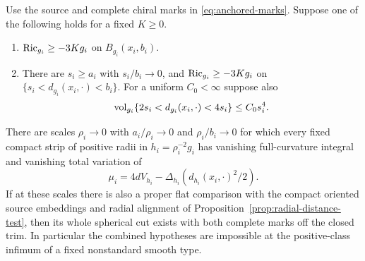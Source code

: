 \begin{proposition}
\label{prop:physical-ricci-flux}
Use the source and complete chiral marks in
\eqref{eq:anchored-marks}. Suppose one of the following
holds for a fixed \(K\ge0\).
\begin{enumerate}
\item \(\operatorname{Ric}_{g_i}\ge-3K g_i\) on \(B_{g_i}(x_i,b_i)\).
\item There are \(s_i\ge a_i\) with \(s_i/b_i\to0\), and
\(\operatorname{Ric}_{g_i}\ge-3K g_i\) on
\(\{s_i<d_{g_i}(x_i,\cdot)<b_i\}\).
For a uniform \(C_0<\infty\) suppose also
\[
 \operatorname{vol}_{g_i}\{2s_i<d_{g_i}(x_i,\cdot)<4s_i\}\le C_0s_i^4 .
\]
\end{enumerate}
There are scales \(\rho_i\to0\) with
\(a_i/\rho_i\to0\) and \(\rho_i/b_i\to0\) for which every
fixed compact strip of positive radii in
\(h_i=\rho_i^{-2}g_i\) has vanishing full-curvature integral
and vanishing total variation of
\[
 \mu_i=4dV_{h_i}-\Delta_{h_i}(d_{h_i}(x_i,\cdot)^2/2).
\]
If at these scales there is also a proper flat comparison
with the compact oriented source embeddings and radial
alignment of Proposition~\ref{prop:radial-distance-test},
then its whole spherical cut exists with both complete
marks off the closed trim. In particular the combined
hypotheses are impossible at the positive-class infimum of
a fixed nonstandard smooth type.
\end{proposition}

